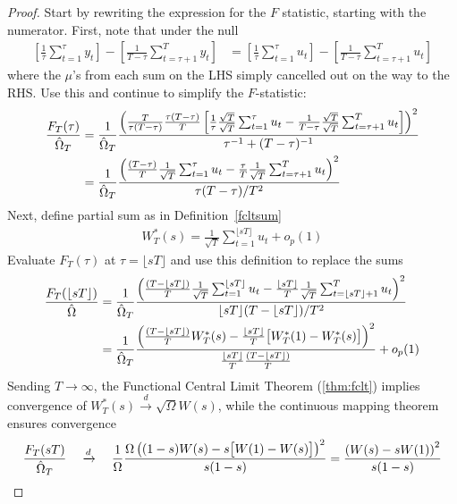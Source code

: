 \documentclass[12pt]{article}
\theoremstyle{plain}
\theoremstyle{definition}
\theoremstyle{remark}
\newcommand{\ra}{\rightarrow}
\newcommand{\dto}{\xrightarrow{d}}
\begin{document}
\begin{proof}
Start by rewriting the expression for the $F$ statistic, starting with
the numerator. First, note that under the null
\begin{align*}
  \left[
  \frac{1}{\tau}\sum_{t=1}^\tau y_t
  \right]
  -
  \left[
  \frac{1}{T-\tau}\sum_{t=\tau+1}^T y_t
  \right]
  &=
  \left[
  \frac{1}{\tau}\sum_{t=1}^\tau u_t
  \right]
  -
  \left[
  \frac{1}{T-\tau}\sum_{t=\tau+1}^T u_t
  \right]
\end{align*}
where the $\mu$'s from each sum on the LHS simply cancelled out on the
way to the RHS.
Use this and continue to simplify the $F$-statistic:
\begin{align*}
  \frac{F_T(\tau)}{\hat{\Omega}_T}
  &=
  \frac{1}{\hat{\Omega}_T}
  \frac{%
  \left(
  \frac{T}{\tau(T-\tau)}
  \frac{\tau(T-\tau)}{T}
  \left[
  \frac{1}{\tau}
  \frac{\sqrt{T}}{\sqrt{T}}
  \sum_{t=1}^\tau u_t
  -
  \frac{1}{T-\tau}
  \frac{\sqrt{T}}{\sqrt{T}}
  \sum_{t=\tau+1}^T u_t
  \right]
  \right)^2
  }{\tau^{-1} + (T-\tau)^{-1}}
  \\
  &=
  \frac{1}{\hat{\Omega}_T}
  \frac{%
  \left(
  \frac{(T-\tau)}{T}
  \frac{1}{\sqrt{T}}
  \sum_{t=1}^\tau u_t
  -
  \frac{\tau}{T}
  \frac{1}{\sqrt{T}}
  \sum_{t=\tau+1}^T u_t
  \right)^2
  }{\tau(T-\tau)/T^2}
\end{align*}
Next, define partial sum as in Definition~\ref{fcltsum}
\begin{align*}
  W_T^*(s) =
  \frac{1}{\sqrt{T}}
  \sum_{t=1}^{\lfloor s T\rfloor}
  u_t
  + o_p(1)
\end{align*}
Evaluate $F_T(\tau)$ at $\tau=\lfloor sT\rfloor$ and use this definition
to replace the sums
\begin{align*}
  \frac{F_T({\lfloor sT\rfloor})}{\hat{\Omega}}
  &=
  \frac{1}{\hat{\Omega}_T}
  \frac{%
  \left(
  \frac{(T-{\lfloor sT\rfloor})}{T}
  \frac{1}{\sqrt{T}}
  \sum_{t=1}^{\lfloor sT\rfloor} u_t
  -
  \frac{{\lfloor sT\rfloor}}{T}
  \frac{1}{\sqrt{T}}
  \sum_{t={\lfloor sT\rfloor}+1}^T u_t
  \right)^2
  }{{\lfloor sT\rfloor}(T-{\lfloor sT\rfloor})/T^2}
  \\
  &=
  \frac{1}{\hat{\Omega}_T}
  \frac{%
    \left(
    \frac{(T-{\lfloor sT\rfloor})}{T}
    W_T^*(s)
    -
    \frac{{\lfloor sT\rfloor}}{T}
    \big[W_T^*(1)-W_T^*(s)\big]
    \right)^2
  }{\frac{\lfloor sT\rfloor}{T}\frac{(T-{\lfloor sT\rfloor})}{T}}
  + o_p(1)
\end{align*}
Sending $T\ra\infty$, the Functional Central Limit Theorem
(\ref{thm:fclt}) implies convergence of
$W_T^*(s)\dto \sqrt{\Omega} W(s)$, while the continuous mapping theorem
ensures convergence
\begin{align*}
  \frac{F_T(sT)}{\hat{\Omega}_T}
  \quad
  \dto
  \quad
  \frac{1}{\Omega}
  \frac{%
    \Omega \left( (1-s) W(s) - s \big[W(1)-W(s)\big] \right)^2
  }{s(1-s)}
  =
  \frac{%
    \left( W(s) - s W(1)\right)^2
  }{s(1-s)}
\end{align*}
\end{proof}
\end{document}
